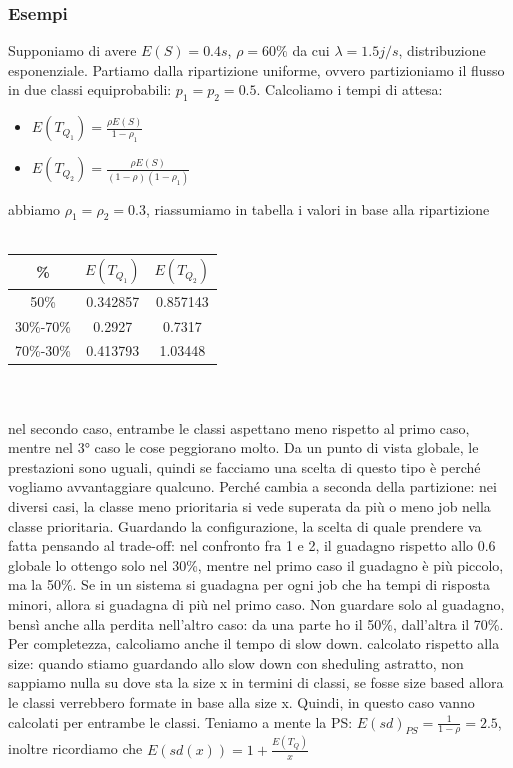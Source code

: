 \documentclass{article}
\begin{document}
\subsubsection{Esempi}
Supponiamo di avere $E(S) = 0.4 s$, $\rho = 60\%$ da cui $\lambda = 1.5 j/s$, distribuzione esponenziale. Partiamo dalla ripartizione uniforme, ovvero partizioniamo il flusso in due classi equiprobabili: $p_1 = p_2 = 0.5$. Calcoliamo i tempi di attesa:
\begin{itemize}
\item $E(T_{Q_1}) = \frac{\rho E(S)}{1 - \rho_1}$
\item $E(T_{Q_2}) = \frac{\rho E(S)}{(1 - \rho)(1 - \rho_1)}$
\end{itemize}
abbiamo $\rho_1 = \rho_2 = 0.3$, riassumiamo in tabella i valori in base alla ripartizione\\\\
\begin{tabular}{ |c|c|c|}
\hline
\% & $E(T_{Q_1})$ & $E(T_{Q_2})$\\
\hline
50\% & 0.342857 & 0.857143\\
\hline
30\%-70\% & 0.2927 & 0.7317\\ 
\hline
70\%-30\% & 0.413793 & 1.03448\\
\hline
\end{tabular}
\\\\ nel secondo caso, entrambe le classi aspettano meno rispetto al primo caso, mentre nel 3° caso le cose peggiorano molto. Da un punto di vista globale, le prestazioni sono uguali, quindi se facciamo una scelta di questo tipo è perché vogliamo avvantaggiare qualcuno. Perché cambia a seconda della partizione: nei diversi casi, la classe meno prioritaria si vede superata da più o meno job nella classe prioritaria. Guardando la configurazione, la scelta di quale prendere va fatta pensando al trade-off: nel confronto fra 1 e 2, il guadagno rispetto allo 0.6 globale lo ottengo solo nel 30\%, mentre nel primo caso il guadagno è più piccolo, ma la 50\%. Se in un sistema si guadagna per ogni job che ha tempi di risposta minori, allora si guadagna di più nel primo caso. Non guardare solo al guadagno, bensì anche alla perdita nell'altro caso: da una parte ho il 50\%, dall'altra il 70\%. Per completezza, calcoliamo anche il tempo di slow down. calcolato rispetto alla size: quando stiamo guardando allo slow down con sheduling astratto, non sappiamo nulla su dove sta la size x in termini di classi, se fosse size based allora le classi verrebbero formate in base alla size x. Quindi, in questo caso vanno calcolati per entrambe le classi. Teniamo a mente la PS: $E(sd)_{PS} = \frac{1}{1 - \rho} = 2.5$, inoltre ricordiamo che $E(sd(x)) = 1 + \frac{E(T_Q)}{x}$\\\\
\end{document}
